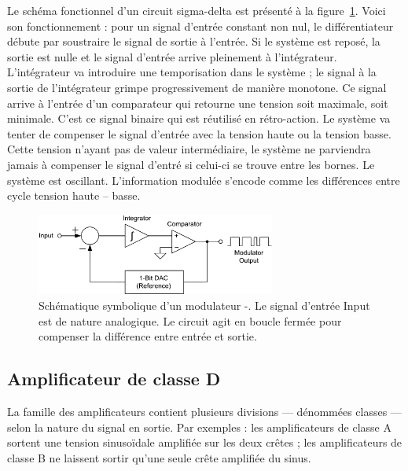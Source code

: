 \documentclass[10pt, oneside, a4paper]{article}
\begin{document}
Le schéma fonctionnel d'un circuit sigma-delta est présenté à la figure~\ref{fig:sigmaDelta}.
Voici son fonctionnement :
pour un signal d'entrée constant non nul, le différentiateur débute par soustraire le signal de sortie à l'entrée.
Si le système est reposé, la sortie est nulle et le signal d'entrée arrive pleinement à l'intégrateur.
L'intégrateur va introduire une temporisation dans le système ;
le signal à la sortie de l'intégrateur grimpe progressivement de manière monotone.
Ce signal arrive à l'entrée d'un comparateur qui retourne une tension soit maximale, soit minimale.
C'est ce signal binaire qui est réutilisé en rétro-action.
Le système va tenter de compenser le signal d'entrée avec la tension haute ou la tension basse.
Cette tension n'ayant pas de valeur intermédiaire, le système ne parviendra jamais à compenser le signal d'entré si celui-ci se trouve entre les bornes.
Le système est oscillant.
L'information modulée s'encode comme les différences entre cycle tension haute -- basse.

\begin{figure}[tbp]
    \centering
    \includegraphics[width=0.7\textwidth]{eps/sigma-delta.eps}
    \caption{Schématique symbolique d'un modulateur \Sigma-\Delta.
    Le signal d'entrée \og Input \fg{}{} est de nature analogique.
    Le circuit agit en boucle fermée pour compenser la différence entre entrée et sortie.}
    \label{fig:sigmaDelta}
\end{figure}


\subsection{Amplificateur de classe D}
	\label{sec:classeD}
La famille des amplificateurs contient plusieurs divisions --- dénommées \og classes \fg{} --- selon la nature du signal en sortie.
Par exemples :
les amplificateurs de classe A sortent une tension sinusoïdale amplifiée sur les deux crêtes ;
les amplificateurs de classe B ne laissent sortir qu'une seule crête amplifiée du sinus.
\end{document}
